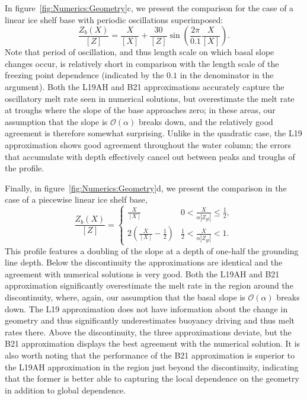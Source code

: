 \documentclass[openacc]{rsproca_new}%
\newcommand{\order}[1]{\mathcal{O}(#1)}
\begin{document}
In figure~\ref{fig:Numerics:Geometry}c, we present the comparison for the case of a linear ice shelf base with periodic oscillations superimposed:
\begin{equation}\label{E:Numerics:SinusoidalGeometry}
\frac{Z_b(X)}{\left[Z\right]}= \frac{X}{\left[X\right]} + \frac{30}{\left[Z\right]}\sin\left(\frac{2\pi}{0.1}\frac{ X}{\left[X\right]}\right).
\end{equation}
Note that period of oscillation, and thus length scale on which basal slope changes occur, is relatively short in comparison with the length scale of the freezing point dependence (indicated by the $0.1$ in the denominator in the argument). Both the L19AH and B21 approximations accurately capture the oscillatory melt rate seen in numerical solutions, but overestimate the melt rate at troughs where the slope of the base approaches zero; in these areas, our assumption that the slope is $\order{\alpha}$ breaks down, and the relatively good agreement is therefore somewhat surprising. Unlike in the quadratic case, the L19 approximation shows good agreement throughout the water column; the errors that accumulate with depth effectively cancel out between peaks and troughs of the profile.  

Finally, in figure~\ref{fig:Numerics:Geometry}d, we present the comparison in the case of a piecewise linear ice shelf base,
\begin{equation}\label{E:Numerics:PiecewiseGeometry}
\frac{Z_b(X)}{\left[Z\right]} = \begin{cases}
  \frac{X}{\left[X\right]}  & 0 <   \frac{X}{\alpha |Z_{gl}|} \leq   \frac{1}{2},\\
   2 \left(\frac{X}{\left[X\right]} -\frac{1}{2}\right)  &  \frac{1}{2} <   \frac{X}{\alpha |Z_{gl}|} <   1.
    \end{cases}
\end{equation}
This profile features a doubling of the slope at a depth of one-half the grounding line depth. Below the discontinuity the approximations are identical and the agreement with numerical solutions is very good. Both the L19AH and B21 approximation significantly overestimate the melt rate in the region around the discontinuity, where, again, our assumption that the basal slope is $\order{\alpha}$ breaks down. The L19 approximation does not have information about the change in geometry and thus significantly underestimates buoyancy driving and thus melt rates there. Above the discontinuity, the three approximations deviate, but the B21 approximation displays the best agreement with the numerical solution. It is also worth noting that the performance of the B21 approximation is superior to the L19AH approximation in the region just beyond the discontinuity, indicating that the former is better able to capturing the local dependence on the geometry in addition to global dependence. 
\end{document}
